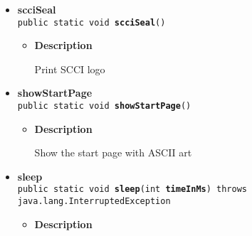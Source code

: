 {{{{{\begin{itemize}
{\begin{itemize}
{Save the game
}
\item{
{\bf  Parameters}
  \begin{itemize}
   \item{
\texttt{player} -- the game's player}
  \end{itemize}
}%
\item{{\bf  Returns} -- 
true if the saving is a success; false otherwise 
}%
\end{itemize}
}%
\item{ 
{\bf  scciSeal}\\
\texttt{public static void\ {\bf  scciSeal}()
\label{personOfInterest.Game.scciSeal()}}%
\begin{itemize}
\item{
{\bf  Description}

Print SCCI logo
}
\end{itemize}
}%
\item{ 
{\bf  showStartPage}\\
\texttt{public static void\ {\bf  showStartPage}()
\label{personOfInterest.Game.showStartPage()}}%
\begin{itemize}
\item{
{\bf  Description}

Show the start page with ASCII art
}
\end{itemize}
}%
\item{ 
{\bf  sleep}\\
\texttt{public static void\ {\bf  sleep}(\texttt{int} {\bf  timeInMs}) throws java.lang.InterruptedException
\label{personOfInterest.Game.sleep(int)}}%
\begin{itemize}
\item{
{\bf  Description}

}
\end{itemize}}
\end{itemize}}}}}}
